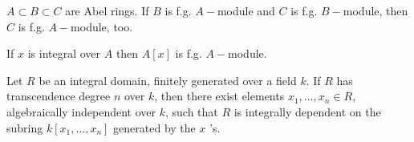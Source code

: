 \documentclass{ctexart}
\newcommand\<{\langle}
\renewcommand\>{\rangle}
\begin{document}
\begin{problem}
$A\subset B\subset C$ are Abel rings. If $B$ is f.g. $A-$module and $C$ is f.g. $B-$module, then $C$ is f.g. $A-$module, too.  
\end{problem}

\begin{problem}
If $x$ is integral over $A$ then $A[x]$ is f.g. $A-$module. 
\end{problem}

\begin{problem}
Let $R$ be an integral domain, finitely generated over a field $k$. If $R$ has transcendence degree $n$ over $k$, then there exist elements $x_1, \ldots, x_n \in R$, algebraically independent over $k$, such that $R$ is integrally dependent on the subring $k\left[x_1, \ldots, x_n\right]$ generated by the $x$ 's.
\end{problem}
\end{document}
